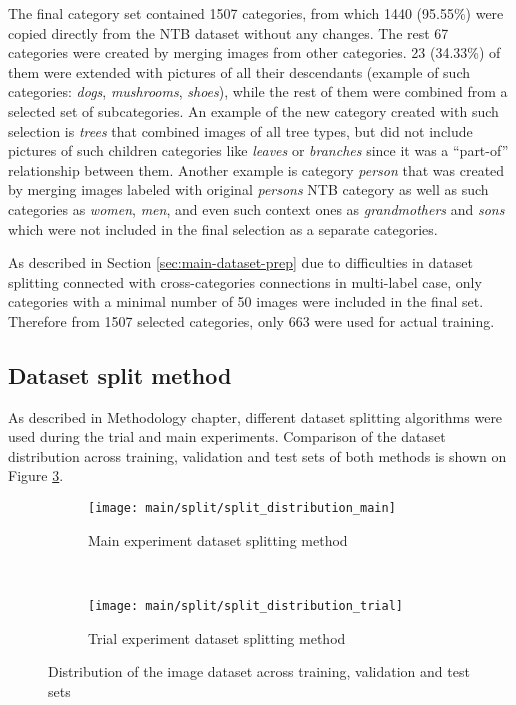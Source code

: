     The final category set contained 1507 categories, from which 1440 (95.55\%) were copied directly from the NTB dataset without any changes. The rest 67 categories were created by merging images from other categories. 23 (34.33\%) of them were extended with pictures of all their descendants (example of such categories: \textit{dogs}, \textit{mushrooms}, \textit{shoes}), while the rest of them were combined from a selected set of subcategories. An example of the new category created with such selection is \textit{trees} that combined images of all tree types, but did not include pictures of such children categories like \textit{leaves} or \textit{branches} since it was a ``part-of'' relationship between them. Another example is category \textit{person} that was created by merging images labeled with original \textit{persons} NTB category as well as such categories as \textit{women}, \textit{men}, and even such context ones as \textit{grandmothers} and \textit{sons} which were not included in the final selection as a separate categories.
    
    As described in Section \ref{sec:main-dataset-prep} due to difficulties in dataset splitting connected with cross-categories connections in multi-label case, only categories with a minimal number of 50 images were included in the final set. Therefore from 1507 selected categories, only 663 were used for actual training.

\subsection{Dataset split method}
    \label{sec:split-comparison}
    As described in Methodology chapter, different dataset splitting algorithms were used during the trial and main experiments. Comparison of the dataset distribution across training, validation and test sets of both methods is shown on Figure \ref{fig:main-split-distribution}.
        
    \begin{figure}[H]
    \centering
    \begin{subfigure}[a]{0.9\textwidth}
        \texttt{[image: main/split/split\_distribution\_main]}
        \caption{Main experiment dataset splitting method}
        \label{fig:main-split-distribution-main}
    \end{subfigure}
    \\
    \begin{subfigure}[a]{0.9\textwidth}
        \texttt{[image: main/split/split\_distribution\_trial]}
        \caption{Trial experiment dataset splitting method}
        \label{fig:main-split-distribution-trial}
    \end{subfigure}
    \caption{Distribution of the image dataset across training, validation and test sets}
    \label{fig:main-split-distribution}
    \end{figure}
    
